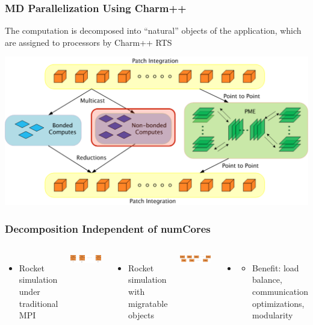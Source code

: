 \begin{frame}[t]
\frametitle{MD Parallelization Using Charm++}
The computation is decomposed into ``natural” objects of the application, which
are assigned to processors by Charm++ RTS
  \begin{center} \includegraphics[width=\textwidth]{figures/md_parallelize.pdf} \end{center}
\end{frame}

\begin{frame}[t]
\frametitle{Decomposition Independent of numCores}
  \begin{columns}
    \begin{itemize}
      \item Rocket simulation under traditional MPI
    \end{itemize}
    \begin{center} \includegraphics[width=.6\textwidth]{figures/rocket_mpi} \end{center}
    \pause
    \begin{itemize}
      \item Rocket simulation with migratable objects
    \end{itemize}
    \begin{center} \includegraphics[width=.6\textwidth]{figures/rocket_charm} \end{center}
    \begin{itemize}
      \item
      \begin{itemize}
      \item Benefit: load balance, communication optimizations, modularity
      \end{itemize}
    \end{itemize}
    \vfill
    \vfill
  \end{columns}
\end{frame}

